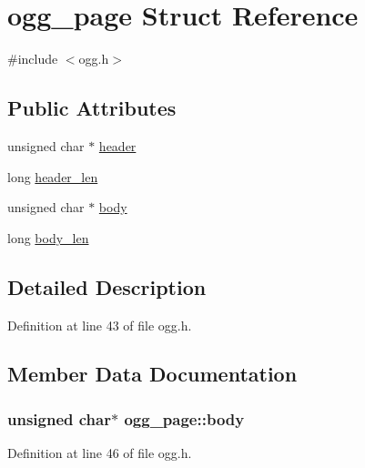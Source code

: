 \hypertarget{structogg__page}{}\section{ogg\+\_\+page Struct Reference}
\label{structogg__page}


{\ttfamily \#include $<$ogg.\+h$>$}

\subsection*{Public Attributes}
\begin{DoxyCompactItemize}
\item 
unsigned char $\ast$ \hyperlink{structogg__page_a9f251dc1a96fbfd84ff2585fbbc03c16}{header}
\item 
long \hyperlink{structogg__page_aeaa6edc2ff9f2c5cc8f0ecf001936b7b}{header\+\_\+len}
\item 
unsigned char $\ast$ \hyperlink{structogg__page_af2fdee76f20ac267c6233f1d5f8afd30}{body}
\item 
long \hyperlink{structogg__page_ac6e649f0001899b512935448a903abac}{body\+\_\+len}
\end{DoxyCompactItemize}


\subsection{Detailed Description}


Definition at line 43 of file ogg.\+h.



\subsection{Member Data Documentation}
\subsubsection[{\texorpdfstring{body}{body}}]{\setlength{\rightskip}{0pt plus 5cm}unsigned char$\ast$ ogg\+\_\+page\+::body}\hypertarget{structogg__page_af2fdee76f20ac267c6233f1d5f8afd30}{}\label{structogg__page_af2fdee76f20ac267c6233f1d5f8afd30}


Definition at line 46 of file ogg.\+h.

